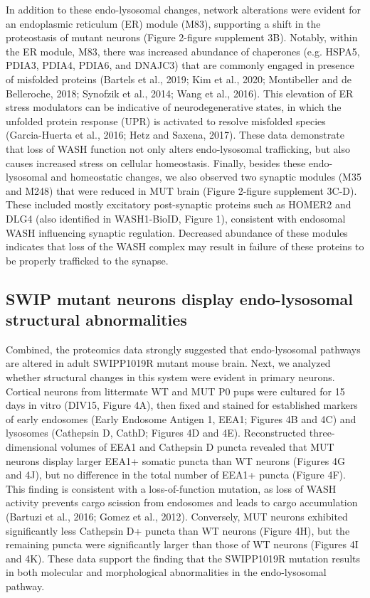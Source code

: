 In addition to these endo-lysosomal changes, network alterations were
evident for an endoplasmic reticulum (ER) module (M83), supporting a shift in
the proteostasis of mutant neurons (Figure 2-figure supplement 3B). Notably,
within the ER module, M83, there was increased abundance of chaperones (e.g.
HSPA5, PDIA3, PDIA4, PDIA6, and DNAJC3) that are commonly engaged in presence of
misfolded proteins (Bartels et al., 2019; Kim et al., 2020; Montibeller and de
Belleroche, 2018; Synofzik et al., 2014; Wang et al., 2016). This elevation of
ER stress modulators can be indicative of neurodegenerative states, in which the
unfolded protein response (UPR) is activated to resolve misfolded species
(Garcia-Huerta et al., 2016; Hetz and Saxena, 2017). These data demonstrate that
loss of WASH function not only alters endo-lysosomal trafficking, but also
causes increased stress on cellular homeostasis. 
Finally, besides these endo-lysosomal and homeostatic changes, we also observed
two synaptic modules (M35 and M248) that were reduced in MUT brain (Figure
2-figure supplement 3C-D). These included mostly excitatory post-synaptic
proteins such as HOMER2 and DLG4 (also identified in WASH1-BioID, Figure 1),
consistent with endosomal WASH influencing synaptic regulation. Decreased
abundance of these modules indicates that loss of the WASH complex may result in
failure of these proteins to be properly trafficked to the synapse.

\subsection{SWIP mutant neurons display endo-lysosomal structural abnormalities}

Combined, the proteomics data strongly suggested that endo-lysosomal
pathways are altered in adult SWIPP1019R mutant mouse brain. Next, we analyzed
whether structural changes in this system were evident in primary neurons.
Cortical neurons from littermate WT and MUT P0 pups were cultured for 15 days in
vitro (DIV15, Figure 4A), then fixed and stained for established markers of
early endosomes (Early Endosome Antigen 1, EEA1; Figures 4B and 4C) and
lysosomes (Cathepsin D, CathD; Figures 4D and 4E). Reconstructed
three-dimensional volumes of EEA1 and Cathepsin D puncta revealed that MUT
neurons display larger EEA1+ somatic puncta than WT neurons (Figures 4G and 4J),
but no difference in the total number of EEA1+ puncta (Figure 4F). This finding
is consistent with a loss-of-function mutation, as loss of WASH activity
prevents cargo scission from endosomes and leads to cargo accumulation (Bartuzi
et al., 2016; Gomez et al., 2012). Conversely, MUT neurons exhibited
significantly less Cathepsin D+ puncta than WT neurons (Figure 4H), but the
remaining puncta were significantly larger than those of WT neurons (Figures 4I
and 4K). These data support the finding that the SWIPP1019R mutation results in
both molecular and morphological abnormalities in the endo-lysosomal pathway.


